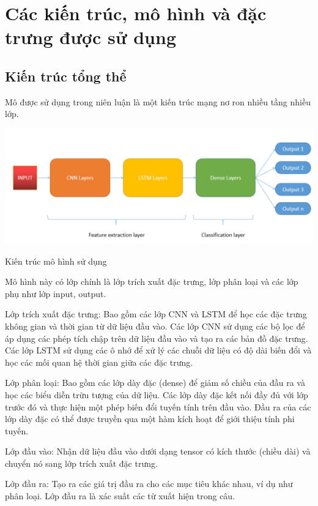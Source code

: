 \section{Các kiến trúc, mô hình và đặc trưng được sử dụng}
\subsection{Kiến trúc tổng thể}

Mô được sử dụng trong niên luận là một kiến trúc mạng nơ ron nhiều tầng nhiều lớp.

\begin{minipage} {\linewidth}
    \captionsetup{type=figure}
    \centering
    \includegraphics[width=1\textwidth]{images/kien_truc.png}
    \caption{Kiến trúc mô hình sử dụng}
\end{minipage}

Mô hình này có lớp chính là lớp trích xuất đặc trưng, lớp phân loại và các lớp phụ như lớp input, output. 

Lớp trích xuất đặc trưng: Bao gồm các lớp CNN và LSTM để học các đặc trưng không gian và thời gian từ dữ liệu đầu vào. Các lớp CNN sử dụng các bộ lọc để áp dụng các phép tích chập trên dữ liệu đầu vào và tạo ra các bản đồ đặc trưng. Các lớp LSTM sử dụng các ô nhớ để xử lý các chuỗi dữ liệu có độ dài biến đổi và học các mối quan hệ thời gian giữa các đặc trưng.

Lớp phân loại: Bao gồm các lớp dày đặc (dense) để giảm số chiều của đầu ra và học các biểu diễn trừu tượng của dữ liệu. Các lớp dày đặc kết nối đầy đủ với lớp trước đó và thực hiện một phép biến đổi tuyến tính trên đầu vào. Đầu ra của các lớp dày đặc có thể được truyền qua một hàm kích hoạt để giới thiệu tính phi tuyến.

Lớp đầu vào: Nhận dữ liệu đầu vào dưới dạng tensor có kích thước (chiều dài) và chuyển nó sang lớp trích xuất đặc trưng.

Lớp đầu ra: Tạo ra các giá trị đầu ra cho các mục tiêu khác nhau, ví dụ như phân loại. Lớp đầu ra là xác suất các từ xuất hiện trong câu.


